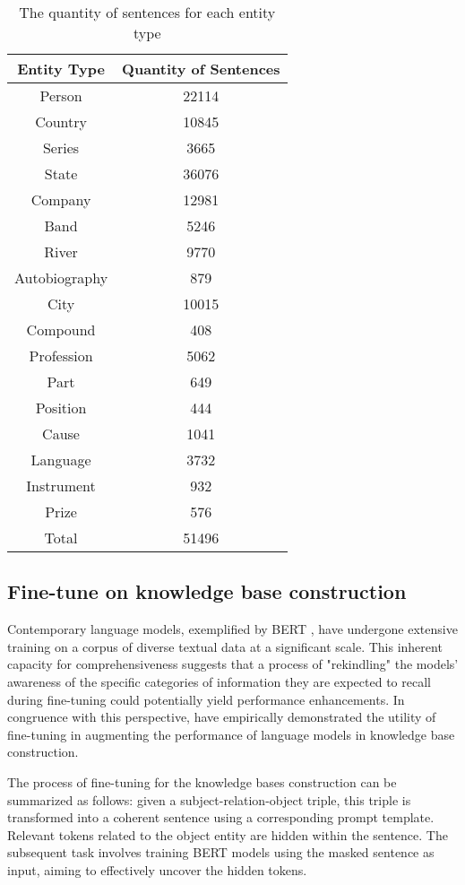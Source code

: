 \documentclass[]{ceurart}
\begin{document}
\begin{table}
\caption{The quantity of sentences for each entity type}\label{tab-corpus}
\begin{tabular}{|c|c|}
\hline
Entity Type & Quantity of Sentences \\
\hline
Person & 22114 \\
Country & 10845 \\
Series & 3665 \\
State & 36076 \\
Company & 12981 \\
Band & 5246 \\
River & 9770 \\
Autobiography & 879 \\
City & 10015 \\
Compound & 408 \\
Profession & 5062 \\
Part & 649 \\
Position & 444 \\
Cause & 1041 \\
Language & 3732 \\
Instrument & 932 \\
Prize & 576 \\
\hline
Total & 51496\\
\hline
\end{tabular}
\end{table}

\subsection{Fine-tune on knowledge base construction}
\label{sec-fine-tune}
Contemporary language models, exemplified by BERT \cite{devlin_bert_2019}, have undergone extensive training on a corpus of diverse textual data at a significant scale. This inherent capacity for comprehensiveness suggests that a process of "rekindling" the models' awareness of the specific categories of information they are expected to recall during fine-tuning could potentially yield performance enhancements. In congruence with this perspective,  \cite{li_task-specific_2022} have empirically demonstrated the utility of fine-tuning in augmenting the performance of language models in knowledge base construction.

The process of fine-tuning for the knowledge bases construction can be summarized as follows: given a subject-relation-object triple, this triple is transformed into a coherent sentence using a corresponding prompt template.  Relevant tokens related to the object entity are hidden within the sentence. The subsequent task involves training BERT models using the masked sentence as input, aiming to effectively uncover the hidden tokens.
\end{document}
